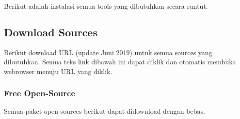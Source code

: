 \documentclass[12pt,]{article}
\begin{document}
	Berikut adalah instalasi semua tools yang dibutuhkan secara runtut.
	
	\subsection{Download Sources}
	
	Berikut download URL (update Juni 2019) untuk semua sources yang dibutuhkan.
	Semua teks link dibawah ini dapat diklik dan otomatis membuka webrowser menuju URL yang diklik.
	
	
	\subsubsection{Free Open-Source}
	
	Semua paket open-sources berikut dapat didownload dengan bebas.
	
\end{document}

